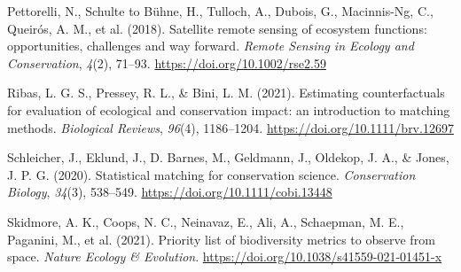 \documentclass[
]{agujournal2019}
\newlength{\cslhangindent}
\newenvironment{CSLReferences}[2] %
 {\begin{list}{}{%
  \setlength{\itemindent}{0pt}
  \setlength{\leftmargin}{0pt}
  \setlength{\parsep}{0pt}
  \ifodd #1
   \setlength{\leftmargin}{\cslhangindent}
   \setlength{\itemindent}{-1\cslhangindent}
  \fi
  \setlength{\itemsep}{#2\baselineskip}}}
 {\end{list}}
\begin{document}
\begin{CSLReferences}{1}{0}
Pettorelli, N., Schulte to Bühne, H., Tulloch, A., Dubois, G.,
Macinnis-Ng, C., Queirós, A. M., et al. (2018). Satellite remote sensing
of ecosystem functions: opportunities, challenges and way forward.
\emph{Remote Sensing in Ecology and Conservation}, \emph{4}(2), 71--93.
\url{https://doi.org/10.1002/rse2.59}

Ribas, L. G. S., Pressey, R. L., \& Bini, L. M. (2021). Estimating
counterfactuals for evaluation of ecological and conservation impact: an
introduction to matching methods. \emph{Biological Reviews},
\emph{96}(4), 1186--1204. \url{https://doi.org/10.1111/brv.12697}

Schleicher, J., Eklund, J., D. Barnes, M., Geldmann, J., Oldekop, J. A.,
\& Jones, J. P. G. (2020). Statistical matching for conservation
science. \emph{Conservation Biology}, \emph{34}(3), 538--549.
\url{https://doi.org/10.1111/cobi.13448}

Skidmore, A. K., Coops, N. C., Neinavaz, E., Ali, A., Schaepman, M. E.,
Paganini, M., et al. (2021). Priority list of biodiversity metrics to
observe from space. \emph{Nature Ecology \& Evolution}.
\url{https://doi.org/10.1038/s41559-021-01451-x}

\end{CSLReferences}
\end{document}
